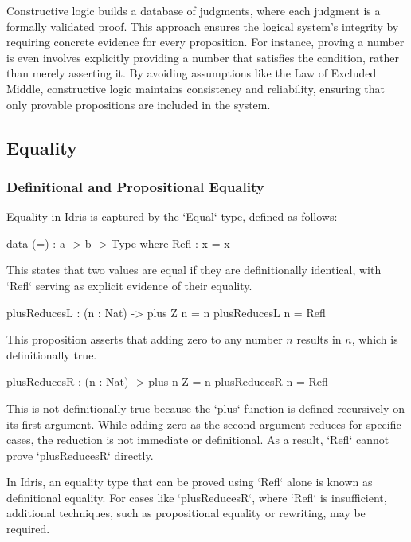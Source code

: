 \documentclass[]{rptuseminar}
\begin{document}
Constructive logic builds a database of judgments, where each judgment is a formally validated proof. This approach ensures the logical system's integrity by requiring concrete evidence for every proposition. For instance, proving a number is even involves explicitly providing a number that satisfies the condition, rather than merely asserting it. By avoiding assumptions like the Law of Excluded Middle, constructive logic maintains consistency and reliability, ensuring that only provable propositions are included in the system.

\subsection{Equality}
\label{sec:Equality}

\subsubsection{Definitional and Propositional Equality}
Equality in Idris is captured by the `Equal` type, defined as follows:

\begin{idris}
data (=) : a -> b -> Type where  
Refl : x = x
\end{idris}

This states that two values are equal if they are definitionally identical, with `Refl` serving as explicit evidence of their equality.

\begin{idris}
plusReducesL : (n : Nat) -> plus Z n = n
plusReducesL n = Refl
\end{idris}

This proposition asserts that adding zero to any number \( n \) results in \( n \), which is definitionally true.

\begin{idris}
plusReducesR : (n : Nat) -> plus n Z = n
plusReducesR n = Refl
\end{idris}

This is not definitionally true because the `plus` function is defined recursively on its first argument. While adding zero as the second argument reduces for specific cases, the reduction is not immediate or definitional. As a result, `Refl` cannot prove `plusReducesR` directly.

In Idris, an equality type that can be proved using `Refl` alone is known as definitional equality. For cases like `plusReducesR`, where `Refl` is insufficient, additional techniques, such as propositional equality or rewriting, may be required.
\end{document}
